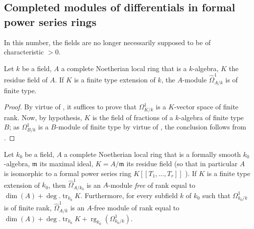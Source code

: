 \subsection{Completed modules of differentials in formal power series rings}
\label{subsection:0.21.9}

In this number, the fields are no longer necessarily supposed to be of characteristic $>0$.

\begin{lemma}[21.9.1]
\label{0.21.9.1}
Let $k$ be a field, $A$ a complete Noetherian local ring that is a $k$-algebra, $K$ the residue field of $A$.
If $K$ is a finite type extension of $k$, the $A$-module $\widehat{\Omega}^1_{A/k}$ is of finite type.
\end{lemma}

\begin{proof}
By virtue of , it suffices to prove that $\Omega^1_{K/k}$ is a $K$-vector space of finite rank.
Now, by hypothesis, $K$ is the field of fractions of a $k$-algebra of finite type $B$; as $\Omega^1_{B/k}$ is a $B$-module of finite type by virtue of , the conclusion follows from .
\end{proof}

\begin{proposition}[21.9.2]
\label{0.21.9.2}
Let $k_0$ be a field, $A$ a complete Noetherian local ring that is a formally smooth $k_0$-algebra, $\mathfrak{m}$ its maximal ideal, $K=A/\mathfrak{m}$ its residue field \textup{(}so that in particular $A$ is isomorphic to a formal power series ring $K[[T_1,\ldots,T_r]]$ \textup{)}.
If $K$ is a finite type extension of $k_0$, then $\widehat{\Omega}^1_{A/k_0}$ is an $A$-module \emph{free} of rank equal to $\dim(A)+\deg.\operatorname{tr}_{k_0} K$.
Furthermore, for every subfield $k$ of $k_0$ such that $\Omega^1_{k_0/k}$ is of finite rank, $\widehat{\Omega}^1_{A/k}$ is an $A$-free module of rank equal to $\dim(A)+\deg.\operatorname{tr}_{k_0} K+\operatorname{rg}_{k_0}(\Omega^1_{k_0/k})$.
\end{proposition}

